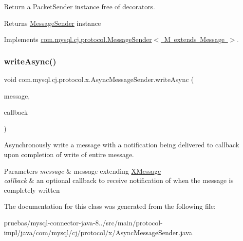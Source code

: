 Return a Packet\+Sender instance free of decorators.

\begin{DoxyReturn}{Returns}
\mbox{\hyperlink{interfacecom_1_1mysql_1_1cj_1_1protocol_1_1_message_sender}{Message\+Sender}} instance 
\end{DoxyReturn}


Implements \mbox{\hyperlink{interfacecom_1_1mysql_1_1cj_1_1protocol_1_1_message_sender_a8066931f03c2fa9cc705716fa10a4517}{com.\+mysql.\+cj.\+protocol.\+Message\+Sender$<$ M extends Message $>$}}.

\mbox{\label{classcom_1_1mysql_1_1cj_1_1protocol_1_1x_1_1_async_message_sender_a405a11dfc5f673ba7e8dbb1410bf25f9}} 
\subsubsection{\texorpdfstring{write\+Async()}{writeAsync()}}
{\footnotesize\ttfamily void com.\+mysql.\+cj.\+protocol.\+x.\+Async\+Message\+Sender.\+write\+Async (\begin{DoxyParamCaption}\item[{\mbox{\hyperlink{classcom_1_1mysql_1_1cj_1_1protocol_1_1x_1_1_x_message}{X\+Message}}}]{message,  }\item[{Completion\+Handler$<$ Long, Void $>$}]{callback }\end{DoxyParamCaption})}

Asynchronously write a message with a notification being delivered to {\ttfamily callback} upon completion of write of entire message.


\begin{DoxyParams}{Parameters}
{\em message} & message extending \mbox{\hyperlink{classcom_1_1mysql_1_1cj_1_1protocol_1_1x_1_1_x_message}{X\+Message}} \\
\hline
{\em callback} & an optional callback to receive notification of when the message is completely written \\
\hline
\end{DoxyParams}


The documentation for this class was generated from the following file\+:\begin{DoxyCompactItemize}
\item 
pruebas/mysql-\/connector-\/java-\/8../src/main/protocol-\/impl/java/com/mysql/cj/protocol/x/Async\+Message\+Sender.\+java\end{DoxyCompactItemize}
